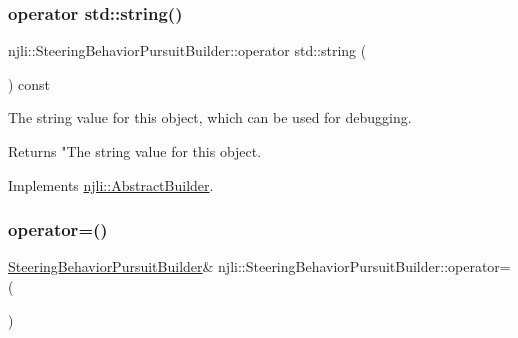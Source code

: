 \subsubsection{\texorpdfstring{operator std\+::string()}{operator std::string()}}
{\footnotesize\ttfamily njli\+::\+Steering\+Behavior\+Pursuit\+Builder\+::operator std\+::string (\begin{DoxyParamCaption}{ }\end{DoxyParamCaption}) const\hspace{0.3cm}{\ttfamily [virtual]}}

The string value for this object, which can be used for debugging.

\begin{DoxyReturn}{Returns}
"The string value for this object. 
\end{DoxyReturn}


Implements \mbox{\hyperlink{classnjli_1_1_abstract_builder_a3e6e553e06d1ca30517ad5fb0bd4d000}{njli\+::\+Abstract\+Builder}}.

\mbox{\label{classnjli_1_1_steering_behavior_pursuit_builder_a87802787e16b91ed772cb6297b40f86a}} 
\subsubsection{\texorpdfstring{operator=()}{operator=()}}
{\footnotesize\ttfamily \mbox{\hyperlink{classnjli_1_1_steering_behavior_pursuit_builder}{Steering\+Behavior\+Pursuit\+Builder}}\& njli\+::\+Steering\+Behavior\+Pursuit\+Builder\+::operator= (\begin{DoxyParamCaption}\item[{const \mbox{\hyperlink{classnjli_1_1_steering_behavior_pursuit_builder}{Steering\+Behavior\+Pursuit\+Builder}} \&}]{ }\end{DoxyParamCaption})\hspace{0.3cm}{\ttfamily [protected]}}

\mbox{\label{classnjli_1_1_steering_behavior_pursuit_builder_a48a1fc54034465e647ca7e05c8638d8f}} 
